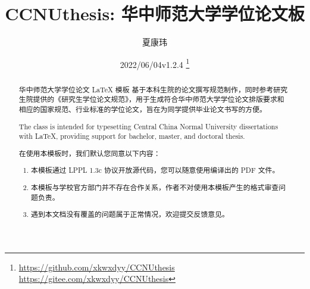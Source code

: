 \documentclass{ccnudoc}
\title{\textcolor{MaterialIndigo800}{%
  \textbf{CCNUthesis: 华中师范大学学位论文\xpinyin[font=\sffamily,format=\color{MaterialIndigo800}]{模}{mu2}板}}}
\author{夏康玮}
\date{2022/06/04\quad v1.2.4%
  \thanks{%
    \parbox{0.5\textwidth}{
      \url{https://github.com/xkwxdyy/CCNUthesis} \\
      \url{https://gitee.com/xkwxdyy/CCNUthesis}
    }
  }
}
\begin{document}

\maketitle

\begin{abstract}
华中师范大学学位论文 \LaTeX{} 模板  基于本科生院的论文撰写规范制作，同时参考研究生院提供的《研究生学位论文规范》，用于生成符合华中师范大学学位论文排版要求和相应的国家规范、行业标准的学位论文，旨在为同学提供毕业论文书写的方便。
\end{abstract}

\def\abstractname{Abstract}
\begin{abstract}
The  class is intended for typesetting Central China Normal University dissertations with \LaTeX{}, providing support for bachelor, master, and doctoral thesis.
\end{abstract}

\vspace{2cm}
\def\abstractname{特别声明}
\begin{abstract}
在使用本模板时，我们默认您同意以下内容：
\begin{enumerate}
  \item 本模板通过 LPPL 1.3c 协议开放源代码，您可以随意使用编译出的 PDF 文件。
  \item 本模板与学校官方部门并不存在合作关系，作者不对使用本模板产生的格式审查问题负责。
  \item 遇到本文档没有覆盖的问题属于正常情况，欢迎提交反馈意见。
\end{enumerate}
\end{abstract}
\end{document}
